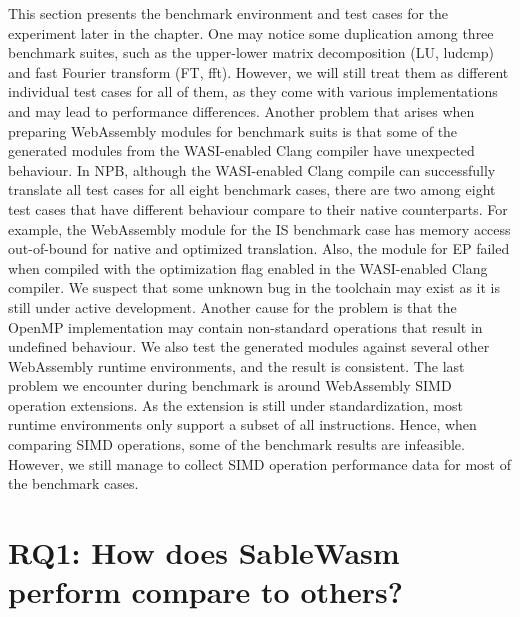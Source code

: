 This section presents the benchmark environment and test cases for the experiment later in the chapter. One may notice some duplication among three benchmark suites, such as the upper-lower matrix decomposition (LU, ludcmp) and fast Fourier transform (FT, fft). However, we will still treat them as different individual test cases for all of them, as they come with various implementations and may lead to performance differences. Another problem that arises when preparing WebAssembly modules for benchmark suits is that some of the generated modules from the WASI-enabled Clang compiler have unexpected behaviour. In NPB, although the WASI-enabled Clang compile can successfully translate all test cases for all eight benchmark cases, there are two among eight test cases that have different behaviour compare to their native counterparts. For example, the WebAssembly module for the IS benchmark case has memory access out-of-bound for native and optimized translation. Also, the module for EP failed when compiled with the optimization flag enabled in the WASI-enabled Clang compiler. We suspect that some unknown bug in the toolchain may exist as it is still under active development. Another cause for the problem is that the OpenMP implementation may contain non-standard operations that result in undefined behaviour. We also test the generated modules against several other WebAssembly runtime environments, and the result is consistent. The last problem we encounter during benchmark is around WebAssembly SIMD operation extensions. As the extension is still under standardization, most runtime environments only support a subset of all instructions. Hence, when comparing SIMD operations, some of the benchmark results are infeasible. However, we still manage to collect SIMD operation performance data for most of the benchmark cases.

\section[RQ1: How does SableWasm perform compare to others?]{{\large RQ1: How does SableWasm perform compare to others?}}

